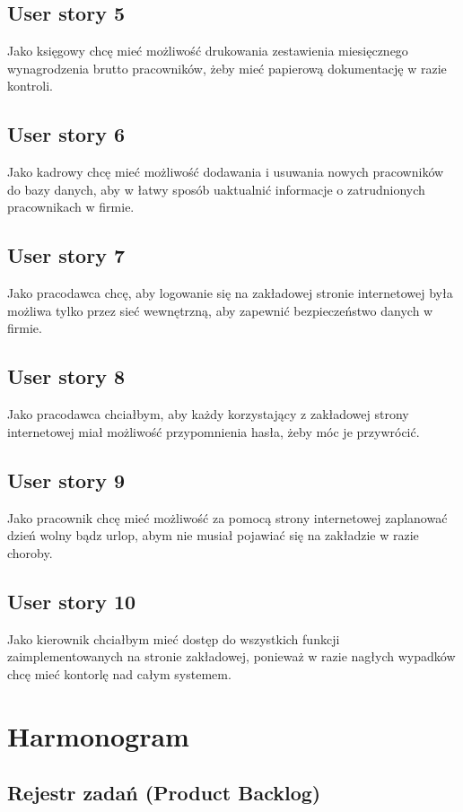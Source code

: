 \documentclass[a4paper]{article}
\begin{document}
\subsection{User story 5}
Jako księgowy chcę mieć możliwość drukowania zestawienia miesięcznego wynagrodzenia brutto pracowników, żeby mieć papierową dokumentację w razie kontroli.

\subsection{User story 6}
Jako kadrowy chcę mieć możliwość dodawania i usuwania nowych pracowników do bazy danych, aby w łatwy sposób uaktualnić informacje o zatrudnionych pracownikach w firmie. 

\subsection{User story 7}
Jako pracodawca chcę, aby logowanie się na zakładowej stronie internetowej była możliwa tylko przez sieć wewnętrzną, aby zapewnić bezpieczeństwo danych w firmie.

\subsection{User story 8}
Jako pracodawca chciałbym, aby każdy korzystający z zakładowej strony internetowej miał możliwość przypomnienia hasła, żeby móc je przywrócić.

\subsection{User story 9}
Jako pracownik chcę mieć możliwość za pomocą strony internetowej zaplanować dzień wolny bądz urlop, abym nie musiał pojawiać się na zakładzie w razie choroby.

\subsection{User story 10}
Jako kierownik chciałbym mieć dostęp do wszystkich funkcji zaimplementowanych na stronie zakładowej, ponieważ w razie nagłych wypadków chcę mieć kontorlę nad całym systemem.


\section{Harmonogram}

\subsection{Rejestr zadań (Product Backlog)}
\end{document}

